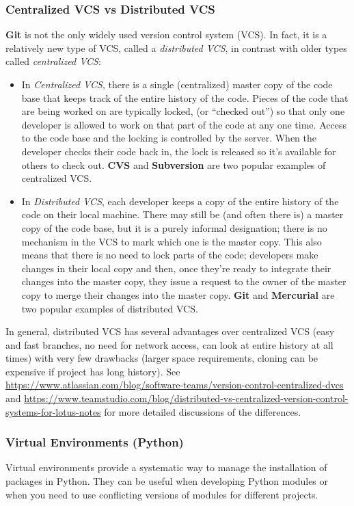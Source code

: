 \documentclass[12pt]{article}
\begin{document}
\subsubsection{Centralized VCS vs Distributed VCS}
\textbf{Git} is not the only widely used version control system (VCS). In fact, it is a relatively new type of VCS, called a \emph{distributed VCS}, in contrast with older types called \emph{centralized VCS}:
\begin{itemize}
    \item In \emph{Centralized VCS}, there is a single (centralized) master copy of the code base that keeps track of the entire history of the code. Pieces of the code that are being worked on are typically locked, (or ``checked out'') so that only one developer is allowed to work on that part of the code at any one time. Access to the code base and the locking is controlled by the server. When the developer checks their code back in, the lock is released so it's available for others to check out. \textbf{CVS} and \textbf{Subversion} are two popular examples of centralized VCS.
    \item In \emph{Distributed VCS}, each developer keeps a copy of the entire history of the code on their local machine. There may still be (and often there is) a master copy of the code base, but it is a purely informal designation; there is no mechanism in the VCS to mark which one is the master copy. This also means that there is no need to lock parts of the code; developers make changes in their local copy and then, once they're ready to integrate their changes into the master copy, they issue a request to the owner of the master copy to merge their changes into the master copy. \textbf{Git} and \textbf{Mercurial} are two popular examples of distributed VCS.
\end{itemize}

In general, distributed VCS has several advantages over centralized VCS (easy and fast branches, no need for network access, can look at entire history at all times) with very few drawbacks (larger space requirements, cloning can be expensive if project has long history). See \url{https://www.atlassian.com/blog/software-teams/version-control-centralized-dvcs} and \url{https://www.teamstudio.com/blog/distributed-vs-centralized-version-control-systems-for-lotus-notes} for more detailed discussions of the differences.

\subsubsection{Virtual Environments (Python)}
Virtual environments provide a systematic way to manage the installation of packages in Python. They can be useful when developing Python modules or when you need to use conflicting versions of modules for different projects.
\end{document}
